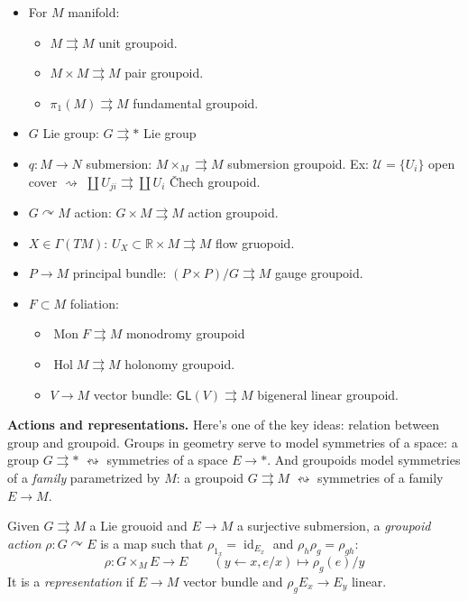 \begin{example}
\label{example-hoyo-groupoids}
\begin{itemize}
\item For $M$ manifold:
\begin{itemize}
\item $M\rightrightarrows M$ unit groupoid.
\item $M \times M \rightrightarrows M$ pair
groupoid.
\item $\pi_{1}(M)\rightrightarrows M$
fundamental groupoid.
\end{itemize}
\item $G$ Lie group: $G \rightrightarrows *$
Lie group

\item $q:M \to N$ submersion: $M \times_M
\rightrightarrows M$ submersion groupoid. Ex:
$\mathcal{U}=\{U_i\}$ open cover
$\rightsquigarrow$ $\coprod
U_{ji}\rightrightarrows\coprod U_i$ \v Chech
groupoid.
\item $G \curvearrowright M$ action: $G
\times M \rightrightarrows M$ action
groupoid.
\item $X \in \Gamma(TM)$: $U_X \subset
\mathbb{R}\times M \rightrightarrows M$ flow
gruopoid.
\item $P \to M$ principal bundle: $(P\times
P)/G \rightrightarrows M$ gauge groupoid.
\item $F \subset M$ foliation:
\begin{itemize}
\item $\operatorname{Mon}F \rightrightarrows
M$ monodromy groupoid
\item $\operatorname{Hol}M \rightrightarrows
M$ holonomy groupoid.
\item $V \to M$ vector bundle:
$\mathsf{GL}(V)\rightrightarrows M$ bigeneral
linear groupoid.
\end{itemize}
\end{itemize}
\end{example}

\medskip\noindent
{\bf Actions and representations.}
Here's one of the key ideas: relation between
group and groupoid. Groups in geometry serve
to model symmetries of a space: a group $G
\rightrightarrows *$ $\leftrightsquigarrow$
symmetries of a space $E \to *$. And
groupoids model symmetries of a \emph{family}
parametrized by $M$: a groupoid $G
\rightrightarrows M$ $\leftrightsquigarrow$
symmetries of a family $E \to M$.

\begin{definition}
\label{definition-hoyo-groupoid-action}
Given $G\rightrightarrows M$ a Lie grouoid
and $E \to M$ a surjective submersion, a
\emph{groupoid action} $\rho:G
\curvearrowright E$ is a map such that
$\rho_{1_x}=\operatorname{id}_{E_x}$ and
$\rho_h\rho_g=\rho_{gh}$:
$$
\rho:G \times_M E \to E \qquad (y\leftarrow
x,e/x)\mapsto \rho_g(e)/y
$$
It is a \emph{representation} if $E \to M$
vector bundle and $\rho_g E_x \to E_y$
linear.
\end{definition}

